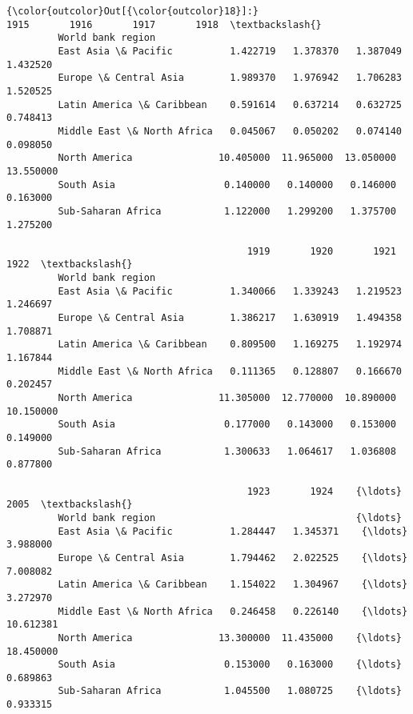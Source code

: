 \documentclass[11pt]{article}
\begin{document}
\begin{Verbatim}[commandchars=\\\{\}]
{\color{outcolor}Out[{\color{outcolor}18}]:}                                  1915       1916       1917       1918  \textbackslash{}
         World bank region                                                        
         East Asia \& Pacific          1.422719   1.378370   1.387049   1.432520   
         Europe \& Central Asia        1.989370   1.976942   1.706283   1.520525   
         Latin America \& Caribbean    0.591614   0.637214   0.632725   0.748413   
         Middle East \& North Africa   0.045067   0.050202   0.074140   0.098050   
         North America               10.405000  11.965000  13.050000  13.550000   
         South Asia                   0.140000   0.140000   0.146000   0.163000   
         Sub-Saharan Africa           1.122000   1.299200   1.375700   1.275200   
         
                                          1919       1920       1921       1922  \textbackslash{}
         World bank region                                                        
         East Asia \& Pacific          1.340066   1.339243   1.219523   1.246697   
         Europe \& Central Asia        1.386217   1.630919   1.494358   1.708871   
         Latin America \& Caribbean    0.809500   1.169275   1.192974   1.167844   
         Middle East \& North Africa   0.111365   0.128807   0.166670   0.202457   
         North America               11.305000  12.770000  10.890000  10.150000   
         South Asia                   0.177000   0.143000   0.153000   0.149000   
         Sub-Saharan Africa           1.300633   1.064617   1.036808   0.877800   
         
                                          1923       1924    {\ldots}           2005  \textbackslash{}
         World bank region                                   {\ldots}                  
         East Asia \& Pacific          1.284447   1.345371    {\ldots}       3.988000   
         Europe \& Central Asia        1.794462   2.022525    {\ldots}       7.008082   
         Latin America \& Caribbean    1.154022   1.304967    {\ldots}       3.272970   
         Middle East \& North Africa   0.246458   0.226140    {\ldots}      10.612381   
         North America               13.300000  11.435000    {\ldots}      18.450000   
         South Asia                   0.153000   0.163000    {\ldots}       0.689863   
         Sub-Saharan Africa           1.045500   1.080725    {\ldots}       0.933315   
         

\end{Verbatim}
\end{document}
